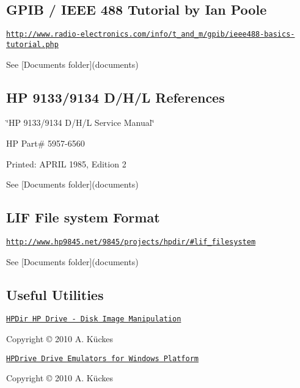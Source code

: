  \subsection*{G\+P\+IB / I\+E\+EE 488 Tutorial by Ian Poole}


\begin{DoxyItemize}
\item \href{http://www.radio-electronics.com/info/t_and_m/gpib/ieee488-basics-tutorial.php}{\tt http\+://www.\+radio-\/electronics.\+com/info/t\+\_\+and\+\_\+m/gpib/ieee488-\/basics-\/tutorial.\+php}
\end{DoxyItemize}

See \mbox{[}Documents folder\mbox{]}(documents)



 \subsection*{HP 9133/9134 D/\+H/L References}


\begin{DoxyItemize}
\item \char`\"{}\+H\+P 9133/9134 D/\+H/\+L Service Manual\char`\"{}
\item HP Part\# 5957-\/6560
\item Printed\+: A\+P\+R\+IL 1985, Edition 2
\item See \mbox{[}Documents folder\mbox{]}(documents) 


\end{DoxyItemize}

\subsection*{L\+IF File system Format}


\begin{DoxyItemize}
\item \href{http://www.hp9845.net/9845/projects/hpdir/#lif_filesystem}{\tt http\+://www.\+hp9845.\+net/9845/projects/hpdir/\#lif\+\_\+filesystem}
\item See \mbox{[}Documents folder\mbox{]}(documents) 


\end{DoxyItemize}

\subsection*{Useful Utilities}


\begin{DoxyItemize}
\item \href{http://www.hp9845.net/9845/projects/hpdir}{\tt H\+P\+Dir HP Drive -\/ Disk Image Manipulation}
\begin{DoxyItemize}
\item Copyright © 2010 A. Kückes
\end{DoxyItemize}
\item \href{http://www.hp9845.net/9845/projects/hpdrive}{\tt H\+P\+Drive Drive Emulators for Windows Platform}
\begin{DoxyItemize}
\item Copyright © 2010 A. Kückes
\end{DoxyItemize}
\end{DoxyItemize}

